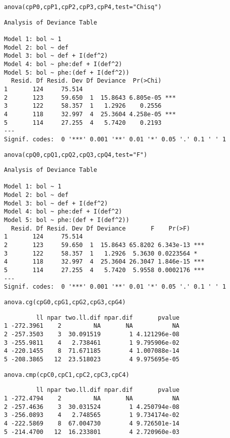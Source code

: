 \documentclass[nohyper, justified, svgnames]{tufte-handout}\usepackage[]{graphicx}\usepackage[]{color}
\makeatletter
\newcommand{\hlstr}[1]{\textcolor[rgb]{0,1,1}{#1}}%
\newcommand{\hlstd}[1]{\textcolor[rgb]{0.878,0.933,0.878}{#1}}%
\newcommand{\hlkwc}[1]{\textcolor[rgb]{0.8,0.6,1}{#1}}%
\newcommand{\hlkwd}[1]{\textcolor[rgb]{1,0.6,0.6}{#1}}%
\newenvironment{kframe}{%
 \def\at@end@of@kframe{}%
 \ifinner\ifhmode%
  \def\at@end@of@kframe{\end{minipage}}%
  \begin{minipage}{\columnwidth}%
 \fi\fi%
 \def\FrameCommand##1{\hskip\@totalleftmargin \hskip-\fboxsep
 \colorbox{shadecolor}{##1}\hskip-\fboxsep
     \hskip-\linewidth \hskip-\@totalleftmargin \hskip\columnwidth}%
 \MakeFramed {\advance\hsize-\width
   \@totalleftmargin\z@ \linewidth\hsize
   \@setminipage}}%
 {\par\unskip\endMakeFramed%
 \at@end@of@kframe}
\newenvironment{knitrout}{}{} %
\makeatother
\begin{document}
\begin{knitrout}\scriptsize
{}\color{fgcolor}\begin{kframe}
\begin{alltt}
\hlkwd{anova}\hlstd{(cpP0, cpP1, cpP2, cpP3, cpP4,} \hlkwc{test} \hlstd{=} \hlstr{"Chisq"}\hlstd{)}
\end{alltt}
\begin{verbatim}
Analysis of Deviance Table

Model 1: bol ~ 1
Model 2: bol ~ def
Model 3: bol ~ def + I(def^2)
Model 4: bol ~ phe:def + I(def^2)
Model 5: bol ~ phe:(def + I(def^2))
  Resid. Df Resid. Dev Df Deviance  Pr(>Chi)    
1       124     75.514                          
2       123     59.650  1  15.8643 6.805e-05 ***
3       122     58.357  1   1.2926    0.2556    
4       118     32.997  4  25.3604 4.258e-05 ***
5       114     27.255  4   5.7420    0.2193    
---
Signif. codes:  0 '***' 0.001 '**' 0.01 '*' 0.05 '.' 0.1 ' ' 1
\end{verbatim}
\begin{alltt}
\hlkwd{anova}\hlstd{(cpQ0, cpQ1, cpQ2, cpQ3, cpQ4,} \hlkwc{test} \hlstd{=} \hlstr{"F"}\hlstd{)}
\end{alltt}
\begin{verbatim}
Analysis of Deviance Table

Model 1: bol ~ 1
Model 2: bol ~ def
Model 3: bol ~ def + I(def^2)
Model 4: bol ~ phe:def + I(def^2)
Model 5: bol ~ phe:(def + I(def^2))
  Resid. Df Resid. Dev Df Deviance       F    Pr(>F)    
1       124     75.514                                  
2       123     59.650  1  15.8643 65.8202 6.343e-13 ***
3       122     58.357  1   1.2926  5.3630 0.0223564 *  
4       118     32.997  4  25.3604 26.3047 1.846e-15 ***
5       114     27.255  4   5.7420  5.9558 0.0002176 ***
---
Signif. codes:  0 '***' 0.001 '**' 0.01 '*' 0.05 '.' 0.1 ' ' 1
\end{verbatim}
\begin{alltt}
\hlkwd{anova.cg}\hlstd{(cpG0, cpG1, cpG2, cpG3, cpG4)}
\end{alltt}
\begin{verbatim}
         ll npar two.ll.dif npar.dif       pvalue
1 -272.3961    2         NA       NA           NA
2 -257.3503    3  30.091519        1 4.121296e-08
3 -255.9811    4   2.738461        1 9.795906e-02
4 -220.1455    8  71.671185        4 1.007088e-14
5 -208.3865   12  23.518023        4 9.975695e-05
\end{verbatim}
\begin{alltt}
\hlkwd{anova.cmp}\hlstd{(cpC0, cpC1, cpC2, cpC3, cpC4)}
\end{alltt}
\begin{verbatim}
         ll npar two.ll.dif npar.dif       pvalue
1 -272.4794    2         NA       NA           NA
2 -257.4636    3  30.031524        1 4.250794e-08
3 -256.0893    4   2.748565        1 9.734174e-02
4 -222.5869    8  67.004730        4 9.726501e-14
5 -214.4700   12  16.233801        4 2.720960e-03
\end{verbatim}
\end{kframe}
\end{knitrout}
\end{document}
